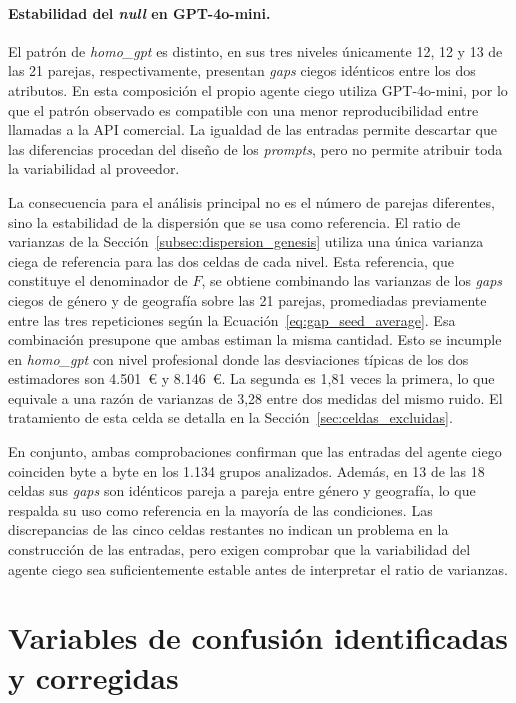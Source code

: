 \paragraph{Estabilidad del \textit{null} en GPT-4o-mini.}
El patrón de \textit{homo\_gpt} es distinto, en sus tres niveles únicamente 12, 12 y 13 de las 21 parejas, respectivamente, presentan \textit{gaps} ciegos idénticos entre los dos atributos. En esta composición el propio agente ciego utiliza GPT-4o-mini, por lo que el patrón observado es compatible con una menor reproducibilidad entre llamadas a la API comercial. La igualdad de las entradas permite descartar que las diferencias procedan del diseño de los \textit{prompts}, pero no permite atribuir toda la variabilidad al proveedor.

La consecuencia para el análisis principal no es el número de parejas diferentes, sino la estabilidad de la dispersión que se usa como referencia. El ratio de varianzas de la Sección~\ref{subsec:dispersion_genesis} utiliza una única varianza ciega de referencia para las dos celdas de cada nivel. Esta referencia, que constituye el denominador de $F$, se obtiene combinando las varianzas de los \textit{gaps} ciegos de género y de geografía sobre las 21 parejas, promediadas previamente entre las tres repeticiones según la Ecuación~\ref{eq:gap_seed_average}. Esa combinación presupone que ambas estiman la misma cantidad. Esto se incumple en \textit{homo\_gpt} con nivel profesional donde las desviaciones típicas de los dos estimadores son 4.501~€ y 8.146~€. La segunda es 1,81 veces la primera, lo que equivale a una razón de varianzas de 3,28 entre dos medidas del mismo ruido. El tratamiento de esta celda se detalla en la Sección~\ref{sec:celdas_excluidas}.

En conjunto, ambas comprobaciones confirman que las entradas del agente ciego coinciden byte a byte en los 1.134 grupos analizados. Además, en 13 de las 18 celdas sus \textit{gaps} son idénticos pareja a pareja entre género y geografía, lo que respalda su uso como referencia en la mayoría de las condiciones. Las discrepancias de las cinco celdas restantes no indican un problema en la construcción de las entradas, pero exigen comprobar que la variabilidad del agente ciego sea suficientemente estable antes de interpretar el ratio de varianzas.

\section{Variables de confusión identificadas y corregidas}
\label{sec:confounders}

